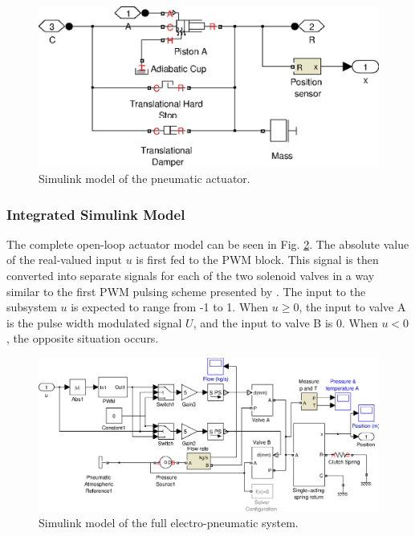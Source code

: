 \begin{figure}[H]
\centering
\includegraphics[scale=0.65]{implementation/figures/pneumatic_modelling3}
\caption{Simulink model of the pneumatic actuator.}
\label{fig:pneumatics_actuator}
\end{figure}

\subsubsection{Integrated Simulink Model}

The complete open-loop actuator model can be seen in Fig. \ref{fig:pneumatics_model_full}. The absolute value of the real-valued input $u$ is first fed to the PWM block. This signal is then converted into separate signals for each of the two solenoid valves in a way similar to the first PWM pulsing scheme presented by \citet{accurate_position}. The input to the subsystem $u$ is expected to range from -1 to 1. When $u\geq0$, the input to valve A is the pulse width modulated signal $U$, and the input to valve B is 0. When $u<0$, the opposite situation occurs.

\begin{figure}[H]
\centering
\includegraphics[scale=0.65]{implementation/figures/pneumatic_modelling4}
\caption{Simulink model of the full electro-pneumatic system.}
\label{fig:pneumatics_model_full}
\end{figure}

